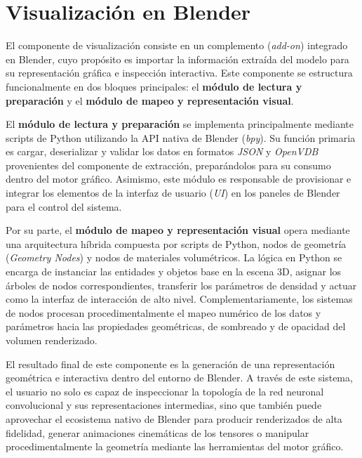 \section{Visualización en Blender}
El componente de visualización consiste en un complemento (\textit{add-on}) integrado en Blender, cuyo propósito es 
importar la información extraída del modelo para su representación gráfica e inspección interactiva. Este 
componente se estructura funcionalmente en dos bloques principales: el \textbf{módulo de lectura y preparación} y 
el \textbf{módulo de mapeo y representación visual}.
\medskip

El \textbf{módulo de lectura y preparación} se implementa principalmente mediante scripts de Python utilizando la 
API nativa de Blender (\textit{bpy}). Su función primaria es cargar, deserializar y validar los datos en formatos 
\textit{JSON} y \textit{OpenVDB} provenientes del componente de extracción, preparándolos para su consumo dentro del 
motor gráfico. Asimismo, este módulo es responsable de provisionar e integrar los elementos de la interfaz de 
usuario (\textit{UI}) en los paneles de Blender para el control del sistema.
\medskip

Por su parte, el \textbf{módulo de mapeo y representación visual} opera mediante una arquitectura híbrida compuesta 
por scripts de Python, nodos de geometría (\textit{Geometry Nodes}) y nodos de materiales volumétricos. La lógica en 
Python se encarga de instanciar las entidades y objetos base en la escena 3D, asignar los árboles de nodos 
correspondientes, transferir los parámetros de densidad y actuar como la interfaz de interacción de alto nivel. 
Complementariamente, los sistemas de nodos procesan procedimentalmente el mapeo numérico de los datos y parámetros 
hacia las propiedades geométricas, de sombreado y de opacidad del volumen renderizado.
\medskip

El resultado final de este componente es la generación de una representación geométrica e interactiva dentro del 
entorno de Blender. A través de este sistema, el usuario no solo es capaz de inspeccionar la topología de la red 
neuronal convolucional y sus representaciones intermedias, sino que también puede aprovechar el ecosistema nativo 
de Blender para producir renderizados de alta fidelidad, generar animaciones cinemáticas de los tensores o manipular 
procedimentalmente la geometría mediante las herramientas del motor gráfico.